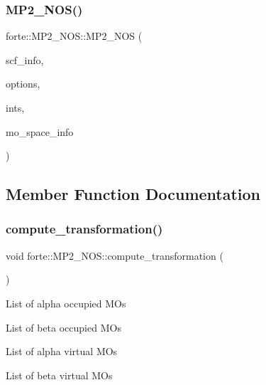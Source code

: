 \subsubsection{\texorpdfstring{M\+P2\+\_\+\+N\+O\+S()}{MP2\_NOS()}}
{\footnotesize\ttfamily forte\+::\+M\+P2\+\_\+\+N\+O\+S\+::\+M\+P2\+\_\+\+N\+OS (\begin{DoxyParamCaption}\item[{std\+::shared\+\_\+ptr$<$ \mbox{\hyperlink{classforte_1_1_s_c_f_info}{S\+C\+F\+Info}} $>$}]{scf\+\_\+info,  }\item[{std\+::shared\+\_\+ptr$<$ \mbox{\hyperlink{classforte_1_1_forte_options}{Forte\+Options}} $>$}]{options,  }\item[{std\+::shared\+\_\+ptr$<$ \mbox{\hyperlink{classforte_1_1_forte_integrals}{Forte\+Integrals}} $>$}]{ints,  }\item[{std\+::shared\+\_\+ptr$<$ \mbox{\hyperlink{classforte_1_1_m_o_space_info}{M\+O\+Space\+Info}} $>$}]{mo\+\_\+space\+\_\+info }\end{DoxyParamCaption})}



\subsection{Member Function Documentation}
\mbox{\label{classforte_1_1_m_p2___n_o_s_a3c093d2809477add44a5d3df9df56587}} 
\subsubsection{\texorpdfstring{compute\+\_\+transformation()}{compute\_transformation()}}
{\footnotesize\ttfamily void forte\+::\+M\+P2\+\_\+\+N\+O\+S\+::compute\+\_\+transformation (\begin{DoxyParamCaption}{ }\end{DoxyParamCaption})\hspace{0.3cm}{\ttfamily [virtual]}}

List of alpha occupied M\+Os

List of beta occupied M\+Os

List of alpha virtual M\+Os

List of beta virtual M\+Os

